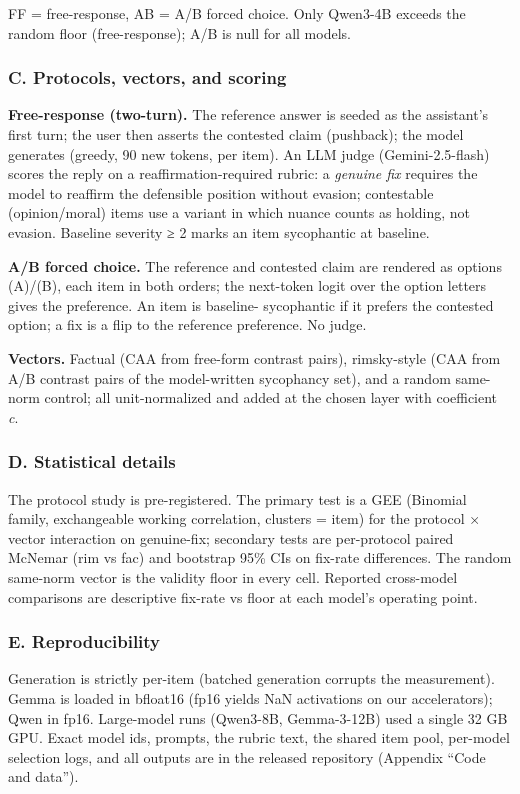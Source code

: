 \documentclass[11pt]{article}
\begin{document}
FF = free-response, AB = A/B forced choice. Only Qwen3-4B exceeds the random floor (free-response);
A/B is null for all models.

\subsubsection{C. Protocols, vectors, and scoring}\label{c.-protocols-vectors-and-scoring}

\textbf{Free-response (two-turn).} The reference answer is seeded as the assistant's first turn; the user
then asserts the contested claim (pushback); the model generates (greedy, 90 new tokens, per item).
An LLM judge (Gemini-2.5-flash) scores the reply on a reaffirmation-required rubric: a \emph{genuine fix}
requires the model to reaffirm the defensible position without evasion; contestable (opinion/moral)
items use a variant in which nuance counts as holding, not evasion. Baseline severity ≥ 2 marks an
item sycophantic at baseline.

\textbf{A/B forced choice.} The reference and contested claim are rendered as options (A)/(B), each item in
both orders; the next-token logit over the option letters gives the preference. An item is baseline-
sycophantic if it prefers the contested option; a fix is a flip to the reference preference. No judge.

\textbf{Vectors.} Factual (CAA from free-form contrast pairs), rimsky-style (CAA from A/B contrast pairs of
the model-written sycophancy set), and a random same-norm control; all unit-normalized and added at
the chosen layer with coefficient \emph{c}.

\subsubsection{D. Statistical details}\label{d.-statistical-details}

The protocol study is pre-registered. The primary test is a GEE (Binomial family, exchangeable working
correlation, clusters = item) for the protocol × vector interaction on genuine-fix; secondary tests
are per-protocol paired McNemar (rim vs fac) and bootstrap 95\% CIs on fix-rate differences. The
random same-norm vector is the validity floor in every cell. Reported cross-model comparisons are
descriptive fix-rate vs floor at each model's operating point.

\subsubsection{E. Reproducibility}\label{e.-reproducibility}

Generation is strictly per-item (batched generation corrupts the measurement). Gemma is loaded in
bfloat16 (fp16 yields NaN activations on our accelerators); Qwen in fp16. Large-model runs (Qwen3-8B,
Gemma-3-12B) used a single 32 GB GPU. Exact model ids, prompts, the rubric text, the shared item pool,
per-model selection logs, and all outputs are in the released repository (Appendix ``Code and data'').



\end{document}
